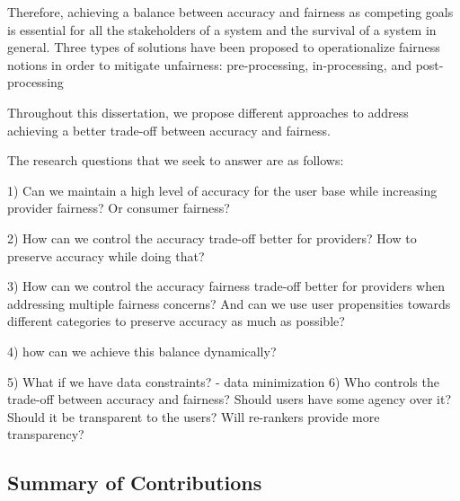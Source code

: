
Therefore, achieving a balance between accuracy and fairness as competing goals is essential for all the stakeholders of a system and the survival of a system in general.
Three types of solutions have been proposed to operationalize fairness notions in order to mitigate  unfairness: pre-processing, in-processing, and post-processing

% 

Throughout this dissertation, we propose different approaches to address achieving a better trade-off between accuracy and fairness. 

The research questions that we seek to answer are as follows:

1) Can we maintain a high level of accuracy for the user base while increasing provider fairness? Or consumer fairness?

2) How can we control the accuracy trade-off better for providers? How to preserve accuracy while doing that? 

3) How can we control the accuracy fairness trade-off better for providers when addressing multiple fairness concerns? And can we use user propensities towards different categories to preserve accuracy as much as possible?

4) how can we achieve this balance dynamically?

5) What if we have data constraints? - data minimization
6) Who controls the trade-off between accuracy and fairness? Should users have some agency over it? Should it be transparent to the users? Will re-rankers provide more transparency?




\subsection{Summary of Contributions}

